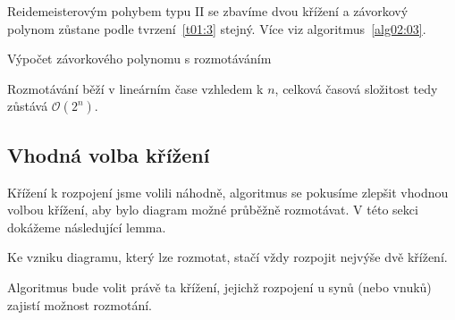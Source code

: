 Reidemeisterovým pohybem typu II se zbavíme dvou křížení a závorkový polynom zůstane podle tvrzení~\ref{t01:3} stejný. Více viz algoritmus~\ref{alg02:03}.



\begin{algorithm}[p]
\caption{Výpočet závorkového polynomu s rozmotáváním} 
\label{alg02:03}
\DontPrintSemicolon

%





\end{algorithm}

Rozmotávání běží v lineárním čase vzhledem k $n$, celková časová složitost tedy zůstává $\mathcal{O}(2^n)$.

\subsection{Vhodná volba křížení} \label{volba}
Křížení k rozpojení jsme volili náhodně, algoritmus se pokusíme zlepšit vhodnou volbou křížení, aby bylo diagram možné průběžně rozmotávat.
V této sekci dokážeme následující lemma.
\begin{lemma}
Ke vzniku diagramu, který lze rozmotat, stačí vždy rozpojit nejvýše dvě křížení.
\end{lemma}
Algoritmus bude volit právě ta křížení, jejichž rozpojení u synů (nebo vnuků) zajistí možnost rozmotání.

